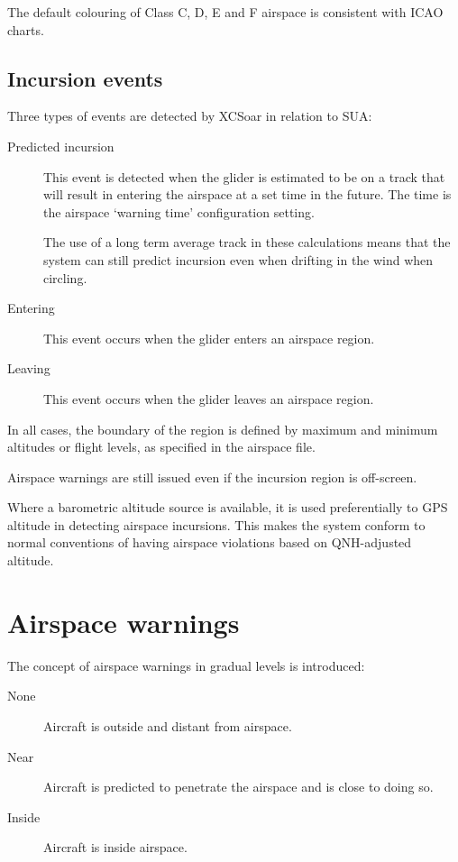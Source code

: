 The default colouring of Class C, D, E and F airspace is consistent
with ICAO charts.

\subsection*{Incursion events}

Three types of events are detected by XCSoar in relation to SUA:
\begin{description}
\item[Predicted incursion] This event is detected when the glider is estimated
to be on a track that will result in entering the airspace at a set
time in the future.  The time is the airspace `warning time'
configuration setting.

The use of a long term average track in these calculations means that
the system can still predict incursion even when drifting in the wind
when circling.


\item[Entering] This event occurs when the glider enters an airspace region.
\item[Leaving] This event occurs when the glider leaves an airspace region.
\end{description}
In all cases, the boundary of the region is defined by maximum and
minimum altitudes or flight levels, as specified in the airspace file.

Airspace warnings are still issued even if the incursion region is
off-screen.

Where a barometric altitude source is available, it is used
preferentially to GPS altitude in detecting airspace incursions.  This
makes the system conform to normal conventions of having airspace
violations based on QNH-adjusted altitude.

\section{Airspace warnings}

The concept of airspace warnings in gradual levels is introduced:
\begin{description}
\item[None] Aircraft is outside and distant from airspace.
\item[\colorbox{AirspaceYellow}{Near}] Aircraft is predicted to penetrate the airspace and 
  is close to doing so.
\item[\colorbox{AirspaceRed}{Inside}] Aircraft is inside airspace.
\end{description}

